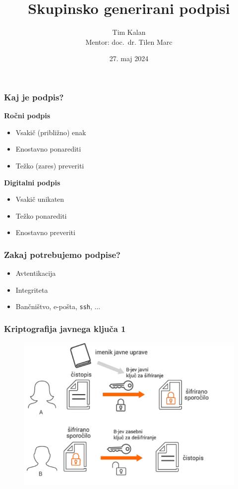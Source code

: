 \documentclass{beamer}    %
\author{Tim Kalan \\ \medskip
        \footnotesize Mentor: doc.~dr. Tilen Marc}
\title{Skupinsko generirani podpisi}
\date{27. maj 2024}
\begin{document}
\begin{frame}
    \titlepage
\end{frame}

\begin{frame}
    \frametitle{Kaj je podpis?}
    \begin{multicols*}{2}
        \textbf{Ročni podpis}
        \begin{itemize}
            \item Vsakič (približno) enak
            \item Enostavno ponarediti
            \item Težko (zares) preveriti
        \end{itemize}
        \columnbreak

        \textbf{Digitalni podpis}
        \begin{itemize}
            \item Vsakič unikaten
            \item Težko ponarediti
            \item Enostavno preveriti
        \end{itemize}
    \end{multicols*}
\end{frame}

\begin{frame}
    \frametitle{Zakaj potrebujemo podpise?}
    \begin{itemize}
        \item Avtentikacija
        \item Integriteta
        \item Bančništvo, e-pošta, \texttt{ssh}, ...
    \end{itemize}
\end{frame}

\begin{frame}
    \frametitle{Kriptografija javnega ključa 1}
    \begin{figure}
        \includegraphics[width=\textwidth]{images/enkripcija.png}
    \end{figure}
\end{frame}
\end{document}
